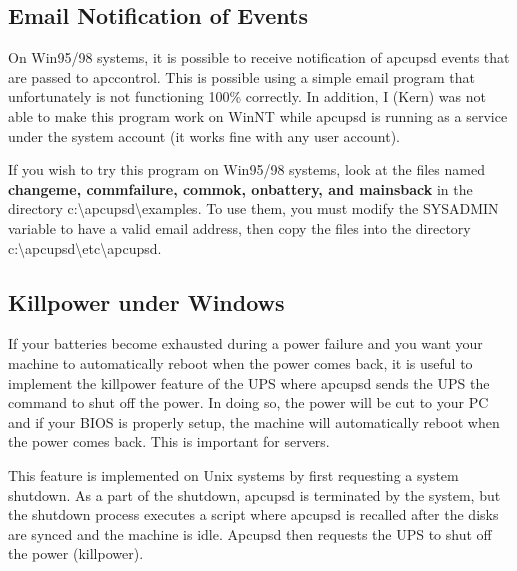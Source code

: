 {{{{{{{\label{Email-Notification-of-Events}

\subsection*{Email Notification of Events}

\label{index-Email-181}
\label{index-Notification_002c-Email-182}
On Win95/98 systems, it is possible to receive notification of apcupsd events
that are passed to apccontrol. This is possible using a simple email program
that unfortunately is not functioning 100\% correctly. In addition, I (Kern)
was not able to make this program work on WinNT while apcupsd is running as a
service under the system account (it works fine with any user account).  

If you wish to try this program on Win95/98 systems, look at the files named
{\bf changeme, commfailure, commok, onbattery, and mainsback} in the directory
c:\textbackslash{}apcupsd\textbackslash{}examples. To use them, you must
modify the SYSADMIN variable to have a valid email address, then copy the
files into the directory
c:\textbackslash{}apcupsd\textbackslash{}etc\textbackslash{}apcupsd. 

\label{Killpower-under-Windows}

\subsection*{Killpower under Windows}

\label{index-Windows_002c-Killpower-183}
If your batteries become exhausted during a power failure and you want your
machine to automatically reboot when the power comes back, it is useful to
implement the killpower feature of the UPS where apcupsd sends the UPS the
command to shut off the power.  In doing so, the power will be cut to your PC
and if your BIOS is properly setup, the machine will automatically reboot when
the power comes back. This is important for servers.  

This feature is implemented on Unix systems by first requesting a system
shutdown. As a part of the shutdown, apcupsd is terminated by the system, but
the shutdown process executes a script where apcupsd is recalled after the
disks are synced and the machine is idle. Apcupsd then requests the UPS to
shut off the power (killpower).  

}}}}}}}
